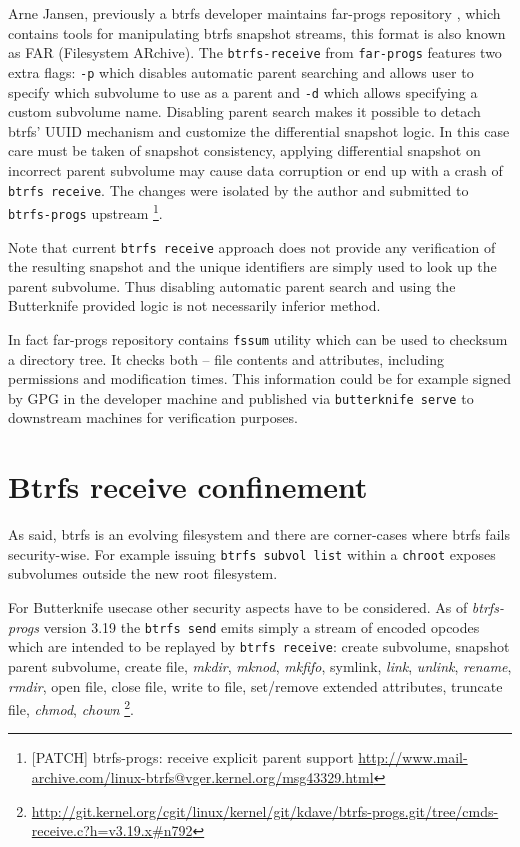 \documentclass[a4paper,11pt]{kth-mag}
\begin{document}
Arne Jansen, previously a \acrshort{btrfs} developer maintains far-progs repository
\cite{far-progs},
which contains tools for manipulating \acrshort{btrfs} snapshot streams,
this format is also known as FAR (Filesystem ARchive).
The \lstinline!btrfs-receive! from \lstinline!far-progs! features
two extra flags: \lstinline!-p! which disables
automatic parent searching and allows user to specify which
subvolume to use as a parent and \lstinline!-d! which
allows specifying a custom subvolume name.
Disabling parent search makes it possible to detach
\acrshort{btrfs}' UUID mechanism and customize the differential snapshot logic.
In this case care must be taken of snapshot consistency,
applying differential snapshot on incorrect parent subvolume
may cause data corruption or end up with a crash
of \lstinline!btrfs receive!.
The changes were isolated by the author and
submitted to \lstinline!btrfs-progs! upstream
\footnote{
[PATCH] btrfs-progs: receive explicit parent support
\url{http://www.mail-archive.com/linux-btrfs@vger.kernel.org/msg43329.html}}.

Note that current \lstinline!btrfs receive! approach does not provide
any verification of the resulting snapshot and the unique
identifiers are simply used to look up the parent subvolume.
Thus disabling automatic parent search and
using the Butterknife provided logic
is not necessarily inferior method.

In fact far-progs repository contains \lstinline!fssum!
utility which can be used to checksum a directory tree.
It checks both -- file contents and attributes,
including permissions and modification times.
This information could be for example signed by GPG
in the developer machine and published via
\lstinline!butterknife serve! to downstream machines
for verification purposes.


\section{Btrfs receive confinement}

As said, \acrshort{btrfs} is an evolving filesystem and there
are corner-cases where \acrshort{btrfs} fails security-wise.
For example issuing \lstinline!btrfs subvol list! within
a \lstinline!chroot! exposes subvolumes outside the new root filesystem.

For Butterknife usecase other security aspects have to be considered.
As of \emph{btrfs-progs} version 3.19 the \lstinline!btrfs send!
emits simply a stream of encoded opcodes
which are intended to be replayed by \lstinline!btrfs receive!:
create subvolume, snapshot parent subvolume,
create file, \emph{mkdir}, \emph{mknod}, \emph{mkfifo}, symlink,
\emph{link}, \emph{unlink}, \emph{rename}, \emph{rmdir}, open file,
close file, write to file, set/remove extended attributes,
truncate file, \emph{chmod}, \emph{chown}
\footnote{\url{http://git.kernel.org/cgit/linux/kernel/git/kdave/btrfs-progs.git/tree/cmds-receive.c?h=v3.19.x\#n792}}.
\end{document}
